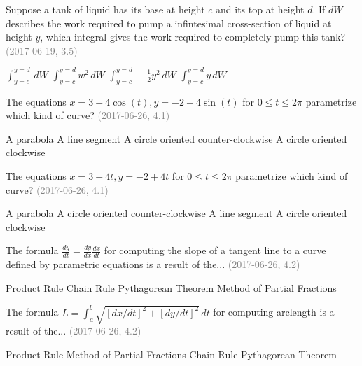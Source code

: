 \documentclass[12pt]{exam}
\newcommand{\questionDate}[1]{\textcolor{gray}{(#1)}}
\newcommand{\<}{\langle}
\renewcommand{\>}{\rangle}
\begin{document}
\begin{questions}
  \question
  Suppose a tank of liquid has its base at height \(c\) and its
  top at height \(d\).
  If \(dW\) describes the work required to pump a infintesimal
  cross-section of liquid at height \(y\), which integral gives the work
  required to completely pump this tank?
  \questionDate{2017-06-19, 3.5}
  \begin{choices}
    \CorrectChoice
      \(\int_{y=c}^{y=d}\,dW\)
    \choice
      \(\int_{y=c}^{y=d}w^2\,dW\)
    \choice
      \(\int_{y=c}^{y=d}-\frac{1}{2}y^2\,dW\)
    \choice
      \(\int_{y=c}^{y=d}y\,dW\)
  \end{choices}

\newpage

  \question
  The equations \(x=3+4\cos(t),y=-2+4\sin(t)\) for \(0\leq t\leq 2\pi\)
  parametrize which kind of curve?
  \questionDate{2017-06-26, 4.1}
  \begin{choices}
    \choice
      A parabola
    \choice
      A line segment
    \CorrectChoice
      A circle oriented counter-clockwise
    \choice
      A circle oriented clockwise
  \end{choices}

  \question
  The equations \(x=3+4t,y=-2+4t\) for \(0\leq t\leq 2\pi\)
  parametrize which kind of curve?
  \questionDate{2017-06-26, 4.1}
  \begin{choices}
    \choice
      A parabola
    \choice
      A circle oriented counter-clockwise
    \CorrectChoice
      A line segment
    \choice
      A circle oriented clockwise
  \end{choices}

  \question
  The formula \(\frac{dy}{dt}=\frac{dy}{dx}\frac{dx}{dt}\) for computing the
  slope of a tangent line to a curve defined by parametric equations is
  a result of the...
  \questionDate{2017-06-26, 4.2}
  \begin{choices}
    \choice
      Product Rule
    \CorrectChoice
      Chain Rule
    \choice
      Pythagorean Theorem
    \choice
      Method of Partial Fractions
  \end{choices}

  \question
  The formula \(L=\int_a^b\sqrt{[dx/dt]^2+[dy/dt]^2}\,dt\) for computing
  arclength is a result of the...
  \questionDate{2017-06-26, 4.2}
  \begin{choices}
    \choice
      Product Rule
    \choice
      Method of Partial Fractions
    \choice
      Chain Rule
    \CorrectChoice
      Pythagorean Theorem
  \end{choices}


\end{questions}
\end{document}
